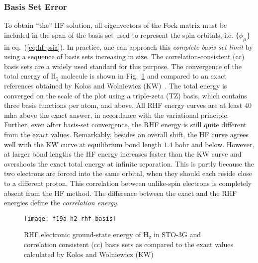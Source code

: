 \subsubsection{Basis Set Error}

To obtain ``the'' HF solution, all eigenvectors of the Fock matrix must be included in the span of the basis set used to represent the spin orbitals, i.e. $\{\phi_\mu\}$ in eq.~(\ref{eq:hf-psia}).
In practice, one can approach this \textit{complete basis set limit} by using a sequence of basis sets increasing in size.
The correlation-consistent (cc) basis sets are a widely used standard for this purpose.
The convergence of the total energy of H$_2$ molecule is shown in Fig.~\ref{fig:hf-h2} and compared to an exact references obtained by Kolos and Wolniewicz (KW)~\cite{Kolos1964}.
The total energy is converged on the scale of the plot using a triple-zeta (TZ) basis, which contains three basis functions per atom, and above.
All RHF energy curves are at least $40$ mha above the exact answer, in accordance with the variational principle.
Further, even after basis-set convergence, the RHF energy is still quite different from the exact values.
Remarkably, besides an overall shift, the HF curve agrees well with the KW curve at equilibrium bond length $1.4$ bohr and below.
However, at larger bond lengths the HF energy increases faster than the KW curve and overshoots the exact total energy at infinite separation.
This is partly because the two electrons are forced into the same orbital, when they should each reside close to a different proton.
This correlation between unlike-spin electrons is completely absent from the HF method.
The difference between the exact and the RHF energies define the \textit{correlation energy}.

\begin{figure}[h]
\centering
\texttt{[image: f19a\_h2-rhf-basis]}
\caption{RHF electronic ground-state energy of H$_2$ in STO-3G and correlation consistent (cc) basis sets as compared to the exact values calculated by Kolos and Wolniewicz (KW)~\cite{Kolos1964}}
\label{fig:hf-h2}
\end{figure}

